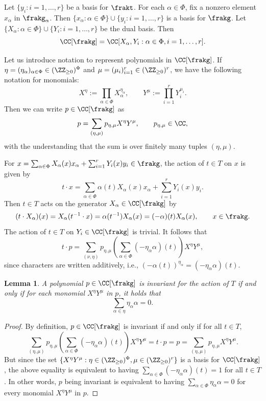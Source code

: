 \documentclass[12pt]{amsart}
\theoremstyle{plain}
\newtheorem{lemma}[theorem]{Lemma}
\begin{document}
Let $\{y_i : i=1, \ldots, r\}$ be a basis for $\frakt$.
For each $\alpha \in \Phi$, fix a nonzero element $x_\alpha$ in $\frakg_\alpha$.
Then $\{x_\alpha : \alpha\in\Phi\}\cup\{y_i:i=1,\ldots,r\}$ is a basis for $\frakg$.
Let $\{X_\alpha : \alpha \in \Phi\}\cup\{Y_i:i=1,\ldots,r\}$ be the dual basis.
Then
$$\CC[\frakg]=\CC[X_\alpha, Y_i : \alpha \in \Phi, i=1,\ldots,r].$$

Let us introduce notation to represent polynomials in $\CC[\frakg]$.
If $\eta =(\eta_\alpha)_{\alpha\in\Phi}\in(\ZZ_{\ge 0})^\Phi$ and $\mu =(\mu_i)_{i=1}^r \in (\ZZ_{\ge 0})^r$, we have the following notation for monomials:
$$X^\eta := \prod_{\alpha\in\Phi} X_\alpha^{\eta_\alpha}, \qquad Y^\mu := \prod_{i=1}^r Y_i^{\mu_i}.$$
Then we can write $p \in \CC[\frakg]$ as
$$p = \sum_{(\eta, \mu)} p_{\eta, \mu} X^\eta Y^\mu, \qquad p_{\eta,\mu} \in \CC,$$
with the understanding that the sum is over finitely many tuples $(\eta, \mu)$.

For $x=\sum_{\alpha \in \Phi} X_\alpha(x) x_\alpha + \sum_{i=1}^r Y_i(x) y_i \in \frakg$, the action of $t \in T$ on $x$ is given by
$$t \cdot x = \sum_{\alpha \in \Phi} \alpha(t) X_\alpha(x) x_\alpha + \sum_{i=1}^r Y_i(x) y_i.$$
Then $t \in T$ acts on the generator $X_\alpha \in \CC[\frakg]$ by
$$(t\cdot X_\alpha)(x) = X_\alpha(t^{-1} \cdot x) =\alpha(t^{-1})X_\alpha(x) = (-\alpha)(t)X_\alpha(x), \qquad x \in \frakg.$$
The action of $t \in T$ on $Y_i \in \CC[\frakg]$ is trivial.
It follows that
$$t \cdot p = \sum_{(\nu, \eta)} p_{\eta, \mu} \left(\sum_{\alpha\in\Phi} (-\eta_\alpha \alpha)(t) \right) X^\eta Y^\mu,$$
since characters are written additively, i.e., $(-\alpha(t))^{\eta_\alpha} = (-\eta_\alpha \alpha)(t)$.

\begin{lemma}
A polynomial $p \in \CC[\frakg]$ is invariant for the action of $T$ if and only if for each monomial $X^\eta Y^\mu$ in $p$, it holds that
$$\sum_{\alpha\in\eta} \eta_\alpha \alpha = 0.$$
\end{lemma}
\begin{proof}
    By definition, $p \in \CC[\frakg]$ is invariant if and only if for all $t \in T$,
    $$ \sum_{(\eta, \mu)} p_{\eta,\mu} \left(\sum_{\alpha\in\Phi} (- \eta_\alpha \alpha)(t)\right) X^\eta Y^\mu =t\cdot p = p = \sum_{(\eta, \mu)} p_{\eta,\mu} X^\eta Y^\mu.$$
    But since the set $\{X^\eta Y^\mu : \eta \in (\ZZ_{\ge 0})^\Phi, \mu \in (\ZZ_{\ge 0})^r\}$ is a basis for $\CC[\frakg]$, the above equality is equivalent to having 
    $\sum_{\alpha\in\Phi} (- \eta_\alpha \alpha)(t) = 1$ for all $t \in T$. In other words, $p$ being invariant is equivalent to having $\sum_{\alpha\in\Phi} \eta_\alpha \alpha = 0$
    for every monomial $X^\eta Y^\mu$ in $p$.
\end{proof}
\end{document}
